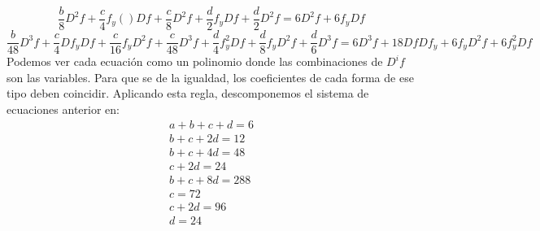 \documentclass[nochap]{apuntes}
\begin{document}
\[\frac{b}{8}D^2f +\frac{c}{4}f_y()Df+\frac{c}{8}D^2f + \frac{d}{2}f_yDf+\frac{d}{2}D^2f= 6D^2f+6f_yDf \]
\[\frac{b}{48}D^3f + \frac{c}{4}Df_yDf+\frac{c}{16}f_yD^2f+\frac{c}{48}D^3f+\frac{d}{4}f^2_yDf+\frac{d}{8}f_yD^2f + \frac{d}{6}D^3f= 6D^3f+18DfDf_y+6f_yD^2f+6f_y^2Df\]
\normalsize
Podemos ver cada ecuación como un polinomio donde las combinaciones de $D^if$ son las variables. Para que se de la igualdad, los coeficientes de cada forma de ese tipo deben coincidir. Aplicando esta regla, descomponemos el sistema de ecuaciones anterior en:
\[\begin{array}{l}
a+b+c+d=6\\
b+c+2d = 12\\
b+c+4d=48 \\
c+2d = 24\\
b+c+8d = 288\\
c = 72 \\
c +2d = 96 \\
d = 24
\end{array}\]
\end{document}
